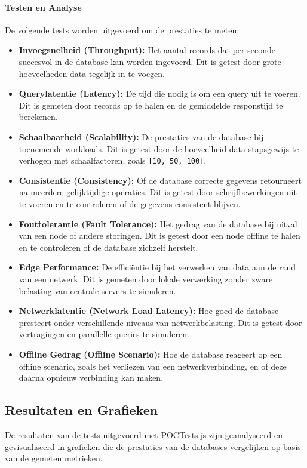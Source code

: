 \paragraph{Testen en Analyse}
De volgende tests worden uitgevoerd om de prestaties te meten:
\begin{itemize}
    \item \textbf{Invoegsnelheid (Throughput):} Het aantal records dat per seconde succesvol in de database kan worden ingevoerd. Dit is getest door grote hoeveelheden data tegelijk in te voegen.
    \item \textbf{Querylatentie (Latency):} De tijd die nodig is om een query uit te voeren. Dit is gemeten door records op te halen en de gemiddelde responstijd te berekenen.
    \item \textbf{Schaalbaarheid (Scalability):} De prestaties van de database bij toenemende workloads. Dit is getest door de hoeveelheid data stapsgewijs te verhogen met schaalfactoren, zoals \texttt{[10, 50, 100]}.
    \item \textbf{Consistentie (Consistency):} Of de database correcte gegevens retourneert na meerdere gelijktijdige operaties. Dit is getest door schrijfbewerkingen uit te voeren en te controleren of de gegevens consistent blijven.
    \item \textbf{Fouttolerantie (Fault Tolerance):} Het gedrag van de database bij uitval van een node of andere storingen. Dit is getest door een node offline te halen en te controleren of de database zichzelf herstelt.
    \item \textbf{Edge Performance:} De efficiëntie bij het verwerken van data aan de rand van een netwerk. Dit is gemeten door lokale verwerking zonder zware belasting van centrale servers te simuleren.
    \item \textbf{Netwerklatentie (Network Load Latency):} Hoe goed de database presteert onder verschillende niveaus van netwerkbelasting. Dit is getest door vertragingen en parallelle queries te simuleren.
    \item \textbf{Offline Gedrag (Offline Scenario):} Hoe de database reageert op een offline scenario, zoals het verliezen van een netwerkverbinding, en of deze daarna opnieuw verbinding kan maken.
    \end{itemize}

\subsection{Resultaten en Grafieken}
De resultaten van de tests uitgevoerd met \href{https://github.com/WoutVC/bachelorproef2024/blob/main/proof_of_concept/POCTests.js}{POCTests.js} zijn geanalyseerd en gevisualiseerd in grafieken die de prestaties van de databases vergelijken op basis van de gemeten metrieken.

